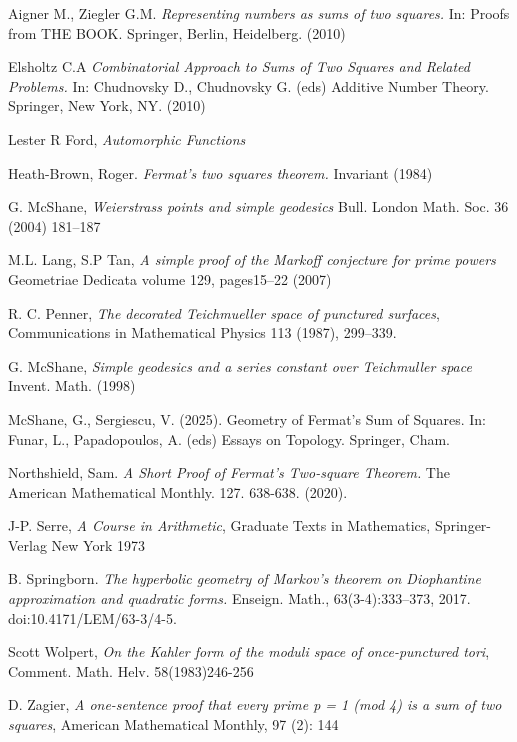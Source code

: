 \documentclass[14pt,a4paper]{amsart}
\begin{document}
Aigner M., Ziegler G.M.  
\textit{Representing numbers as sums of two squares.} In: Proofs from THE BOOK. Springer, Berlin, Heidelberg. (2010)


Elsholtz C.A 
\textit{Combinatorial Approach to Sums of Two Squares and Related Problems.}
 In: Chudnovsky D., Chudnovsky G. (eds) Additive Number Theory. Springer, New York, NY.
 (2010) 


Lester R Ford,
\textit{Automorphic Functions}

Heath-Brown, Roger. 
\textit{ Fermat’s two squares theorem.} Invariant (1984) 

G. McShane,
\textit{Weierstrass points and simple geodesics}
Bull. London Math. Soc. 36 (2004) 181–187 

M.L. Lang, S.P Tan,
\textit{A simple proof of the Markoff conjecture for prime powers}
Geometriae Dedicata volume 129, pages15–22 (2007)

R. C. Penner, 
\textit{The decorated Teichmueller space of punctured surfaces}, 
Communications in Mathematical Physics 113 (1987), 299–339.

G. McShane,
\textit{Simple geodesics and a series constant over Teichmuller space} Invent. Math. (1998)

McShane, G., Sergiescu, V. (2025). Geometry of Fermat’s Sum of Squares. In: Funar, L., Papadopoulos, A. (eds) Essays on Topology. Springer, Cham. 

Northshield, Sam. 
\textit{A Short Proof of Fermat’s Two-square Theorem.} The American Mathematical Monthly. 127. 638-638. (2020). 

J-P. Serre,
\textit{A Course in Arithmetic},
Graduate Texts in Mathematics,
Springer-Verlag New York
1973

B. Springborn. 
\textit{The hyperbolic geometry of Markov's theorem on
Diophantine approximation and quadratic forms.}
Enseign. Math.,
63(3-4):333--373, 2017. doi:10.4171/LEM/63-3/4-5.

Scott Wolpert,
\textit{On the Kahler form of the moduli space of once-punctured tori}, 
Comment. Math. Helv. 58(1983)246-256

D. Zagier,
 \textit{A one-sentence proof that every prime p = 1 (mod 4) is a sum of two squares}, 
 American Mathematical Monthly, 97 (2): 144
 
\end{document}

